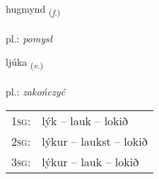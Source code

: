 \documentclass[frontgrid, backgrid]{flacards}\usepackage[]{graphicx}\usepackage[]{xcolor}
\begin{document}
\renewcommand{\blhead}{\vskip5pt {\small\bfseries\footnotesize Nafnorð | Noun }}
\renewcommand{\bcfoot}{\vskip5pt \hspace{2pt}{\small\bfseries\footnotesize 1K}}


{hugmynd \small{\textsubscript{(\textit{f.})}} \\[1ex] %
\textphonetic{[hʏɣmɪnt]} \\
pl.: \emph{pomysł} \\  [2ex]
\renewcommand*{\arraystretch}{0.8}
}

\renewcommand{\flhead}{\vskip5pt \fboxsep=0pt {\small\bfseries\footnotesize Sagnorð | Verb}}
\renewcommand{\fcfoot}{\vskip5pt \fboxsep=0pt \hspace{2pt}{\small\bfseries\footnotesize 1K}}

\renewcommand{\blhead}{\vskip5pt {\small\bfseries\footnotesize Sagnorð | Verb }}
\renewcommand{\bcfoot}{\vskip5pt \hspace{2pt}{\small\bfseries\footnotesize 1K}}


{ljúka \small{\textsubscript{(\textit{v.})}} \\[1ex] %
\textphonetic{[ljuːka]} \\
pl.: \emph{zakończyć} \\  [2ex]
\renewcommand*{\arraystretch}{0.8}
\begin{tabular}{p{1cm}l}
\textsc{1sg}: & lýk -- lauk -- lokið \\ 
\textsc{2sg}: & lýkur -- laukst -- lokið \\ 
\textsc{3sg}: & lýkur -- lauk -- lokið \\ 
\end{tabular}
}

\renewcommand{\flhead}{\vskip5pt \fboxsep=0pt {\small\bfseries\footnotesize Nafnorð | Noun}}
\renewcommand{\fcfoot}{\vskip5pt \fboxsep=0pt \hspace{2pt}{\small\bfseries\footnotesize 1K}}
\end{document}

